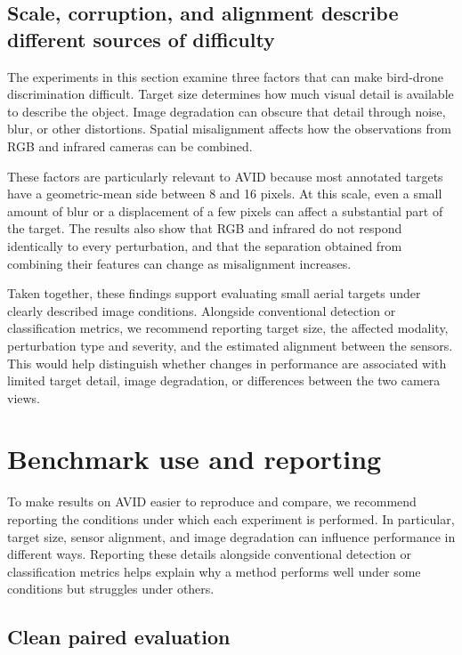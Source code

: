 \documentclass[10pt]{article}
\newcommand{\dataset}{\textsc{AVID}}
\begin{document}
\subsection{Scale, corruption, and alignment describe different sources of difficulty}

The experiments in this section examine three factors that can make bird-drone discrimination difficult. Target size determines how much visual detail is available to describe the object. Image degradation can obscure that detail through noise, blur, or other distortions. Spatial misalignment affects how the observations from RGB and infrared cameras can be combined.

These factors are particularly relevant to \dataset{} because most annotated targets have a geometric-mean side between 8 and 16 pixels. At this scale, even a small amount of blur or a displacement of a few pixels can affect a substantial part of the target. The results also show that RGB and infrared do not respond identically to every perturbation, and that the separation obtained from combining their features can change as misalignment increases.

Taken together, these findings support evaluating small aerial targets under clearly described image conditions. Alongside conventional detection or classification metrics, we recommend reporting target size, the affected modality, perturbation type and severity, and the estimated alignment between the sensors. This would help distinguish whether changes in performance are associated with limited target detail, image degradation, or differences between the two camera views.

\section{Benchmark use and reporting}
\label{sec:protocol}

To make results on \dataset{} easier to reproduce and compare, we recommend reporting the conditions under which each experiment is performed. In particular, target size, sensor alignment, and image degradation can influence performance in different ways. Reporting these details alongside conventional detection or classification metrics helps explain why a method performs well under some conditions but struggles under others.

\subsection{Clean paired evaluation}
\end{document}
